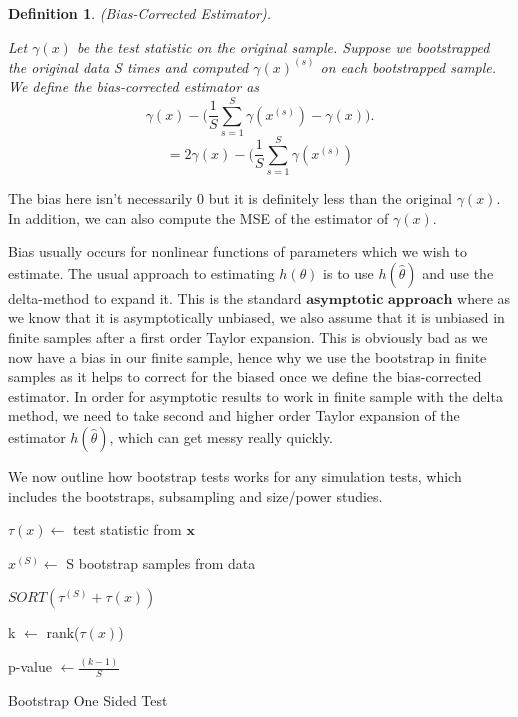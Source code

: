 \documentclass[twoside]{article}
\newtheorem{definition}[theorem]{Definition}
\begin{document}
\begin{definition}(Bias-Corrected Estimator).

Let $\gamma(x)$ be the test statistic on the original sample. Suppose we bootstrapped the original data S times and computed $\gamma(x)^{(s)}$ on each bootstrapped sample. We define the bias-corrected estimator as
$$
\gamma(x) - \big(\frac{1}{S}\sum_{s=1}^S\gamma(x^{(s)}) - \gamma(x) \big).
$$
$$
= 2\gamma(x) - \big(\frac{1}{S}\sum_{s=1}^S\gamma(x^{(s)})
$$
\end{definition}

The bias here isn't necessarily 0 but it is definitely less than the original $\gamma(x)$. In addition, we can also compute the MSE of the estimator of $\gamma(x)$.


Bias usually occurs for nonlinear functions of parameters which we wish to estimate. The usual approach to estimating $h(\theta)$ is to use $h(\hat{\theta})$ and use the delta-method to expand it. This is the standard $\textbf{asymptotic approach}$ where as we know that it is asymptotically unbiased, we also assume that it is unbiased in finite samples after a first order Taylor expansion. This is obviously bad as we now have a bias in our finite sample, hence why we use the bootstrap in finite samples as it helps to correct for the biased once we define the bias-corrected estimator. In order for asymptotic results to work in finite sample with the delta method, we need to take second and higher order Taylor expansion of the estimator $h(\hat{\theta})$, which can get messy really quickly.

We now outline how bootstrap tests works for any simulation tests, which includes the bootstraps, subsampling and size/power studies.
\begin{algorithm}
\DontPrintSemicolon
{}

$\tau(x) \gets$ test statistic from $\textbf{x}$\;

$x^{(S)} \gets$ S bootstrap samples from data\;


$SORT(\tau^{(S)} + \tau(x))$\;

k $\gets$ rank($\tau(x)$)

p-value $\gets \frac{(k-1)}{S}$ 

\caption{{\sc Bootstrap One Sided Test}}
\label{algo:duplicate}
\end{algorithm}
\end{document}
